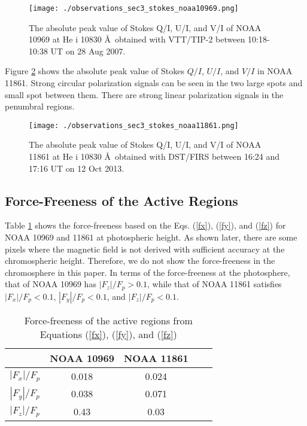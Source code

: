 \documentclass[manuscript]{aastex61}
\begin{document}
\begin{figure}
\begin{center}
\texttt{[image: ./observations\_sec3\_stokes\_noaa10969.png]}
\end{center}
\caption{The absolute peak value of Stokes Q/I, U/I, and V/I of NOAA 10969 at He {\sc i} 10830 \AA \ 
obtained with VTT/TIP-2 between 10:18-10:38 UT on 28 Aug 2007.}
\label{sec3:observation_stokes_noaa10969}
\end{figure}


Figure \ref{sec3:observation_stokes_noaa11861} shows the absolute peak value of Stokes $Q/I$, $U/I$, and $V/I$ in NOAA 11861.
Strong circular polarization signals can be seen in the two large spots and small spot between them.
There are strong linear polarization signals in the penumbral regions.
\begin{figure}
\texttt{[image: ./observations\_sec3\_stokes\_noaa11861.png]}
\caption{The absolute peak value of Stokes Q/I, U/I, and V/I of NOAA 11861 at He {\sc i} 10830 \AA \ obtained with DST/FIRS between 16:24 and 17:16 UT on 12 Oct 2013. }
\label{sec3:observation_stokes_noaa11861}
\end{figure}

\subsection{Force-Freeness of the Active Regions}
Table \ref{sec3:table:forcefreeness} shows the force-freeness based on the
Eqs. (\ref{fx}), (\ref{fy}), and (\ref{fz}) for NOAA 10969 and 11861 at photospheric height. %
As shown later, there are some pixels where the magnetic field is not derived with sufficient accuracy at the chromospheric height. 
Therefore, we do not show the force-freeness in the chromosphere in this paper. 
In terms of the force-freeness at the photosphere, that of NOAA 10969 has
$|F_z|/F_p>0.1$, while that of NOAA 11861 satisfies $|F_x|/F_p<0.1$,
$|F_y|/F_p<0.1$, and $|F_z|/F_p<0.1$.

 \begin{table}[H]
\centering
\caption{Force-freeness of the active regions from Equations (\ref{fx}), (\ref{fy}), and (\ref{fz})}
 \begin{tabular}{ccccc} 
\toprule
  & NOAA 10969  & NOAA 11861 \\
\toprule
 $|F_x|/F_p$& 0.018 &0.024\\
  $|F_y|/F_p$& 0.038 &0.071\\
   $|F_z|/F_p$& 0.43 &0.03 \\
\hline
\bottomrule
\end{tabular}
\label{sec3:table:forcefreeness}
\end{table}
\end{document}
